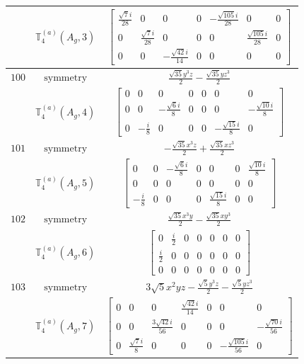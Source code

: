 \documentclass[fleqn,8pt,landscape]{jsarticle}
\begin{document}
\begin{longtable}{ccc}
$  $ & $ \mathbb{T}_{4}^{(a)}(A_{g},3) $ & $ \begin{bmatrix} \frac{\sqrt{7} i}{28} & 0 & 0 & 0 & - \frac{\sqrt{105} i}{28} & 0 & 0 \\ 0 & \frac{\sqrt{7} i}{28} & 0 & 0 & 0 & \frac{\sqrt{105} i}{28} & 0 \\ 0 & 0 & - \frac{\sqrt{42} i}{14} & 0 & 0 & 0 & 0 \end{bmatrix} $ \\ \hline
$ 100 $ & $ \text{symmetry} $ & $ \frac{\sqrt{35} y^{3} z}{2} - \frac{\sqrt{35} y z^{3}}{2} $ \\
$  $ & $ \mathbb{T}_{4}^{(a)}(A_{g},4) $ & $ \begin{bmatrix} 0 & 0 & 0 & 0 & 0 & 0 & 0 \\ 0 & 0 & - \frac{\sqrt{6} i}{8} & 0 & 0 & 0 & - \frac{\sqrt{10} i}{8} \\ 0 & - \frac{i}{8} & 0 & 0 & 0 & - \frac{\sqrt{15} i}{8} & 0 \end{bmatrix} $ \\ \hline
$ 101 $ & $ \text{symmetry} $ & $ - \frac{\sqrt{35} x^{3} z}{2} + \frac{\sqrt{35} x z^{3}}{2} $ \\
$  $ & $ \mathbb{T}_{4}^{(a)}(A_{g},5) $ & $ \begin{bmatrix} 0 & 0 & - \frac{\sqrt{6} i}{8} & 0 & 0 & 0 & \frac{\sqrt{10} i}{8} \\ 0 & 0 & 0 & 0 & 0 & 0 & 0 \\ - \frac{i}{8} & 0 & 0 & 0 & \frac{\sqrt{15} i}{8} & 0 & 0 \end{bmatrix} $ \\ \hline
$ 102 $ & $ \text{symmetry} $ & $ \frac{\sqrt{35} x^{3} y}{2} - \frac{\sqrt{35} x y^{3}}{2} $ \\
$  $ & $ \mathbb{T}_{4}^{(a)}(A_{g},6) $ & $ \begin{bmatrix} 0 & \frac{i}{2} & 0 & 0 & 0 & 0 & 0 \\ \frac{i}{2} & 0 & 0 & 0 & 0 & 0 & 0 \\ 0 & 0 & 0 & 0 & 0 & 0 & 0 \end{bmatrix} $ \\ \hline
$ 103 $ & $ \text{symmetry} $ & $ 3 \sqrt{5} x^{2} y z - \frac{\sqrt{5} y^{3} z}{2} - \frac{\sqrt{5} y z^{3}}{2} $ \\
$  $ & $ \mathbb{T}_{4}^{(a)}(A_{g},7) $ & $ \begin{bmatrix} 0 & 0 & 0 & \frac{\sqrt{42} i}{14} & 0 & 0 & 0 \\ 0 & 0 & \frac{3 \sqrt{42} i}{56} & 0 & 0 & 0 & - \frac{\sqrt{70} i}{56} \\ 0 & \frac{\sqrt{7} i}{8} & 0 & 0 & 0 & - \frac{\sqrt{105} i}{56} & 0 \end{bmatrix} $ \\ \hline

\end{longtable}
\end{document}

